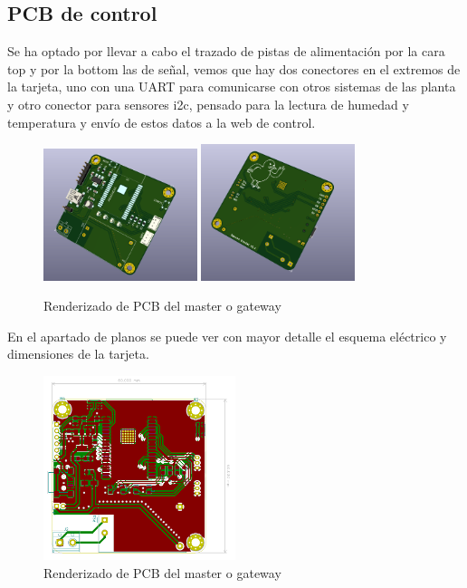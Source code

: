 \documentclass[a4paper ,12pt, onecolumn]{article}
\begin{document}
    \subsection{PCB de control}
        Se ha optado por llevar a cabo el trazado de pistas de alimentación por la cara top y por la bottom las de señal, vemos que hay dos 
        conectores en el extremos de la tarjeta, uno con una UART para comunicarse con otros sistemas de las planta y otro conector para sensores
        i2c, pensado para la lectura de humedad y temperatura y envío de estos datos a la web de control.
        \begin{center}
            \begin{figure}[h]
                \centering
                \includegraphics[width=0.4\textwidth]{../receiver_1.PNG}
                \includegraphics[width=0.4\textwidth]{../receiver_2.PNG}
                \caption{Renderizado de PCB del master o gateway}
                \label{fig:mesh1}
            \end{figure}    
        \end{center}
        En el apartado de planos se puede ver con mayor detalle el esquema eléctrico y dimensiones de la tarjeta.
        \begin{center}
            \begin{figure}[h]
                \centering
                \includegraphics[width=0.5\textwidth]{../receiver_PCB.PNG}
                \caption{Renderizado de PCB del master o gateway}
                \label{fig:mesh1}
            \end{figure}    
        \end{center}
\end{document}
